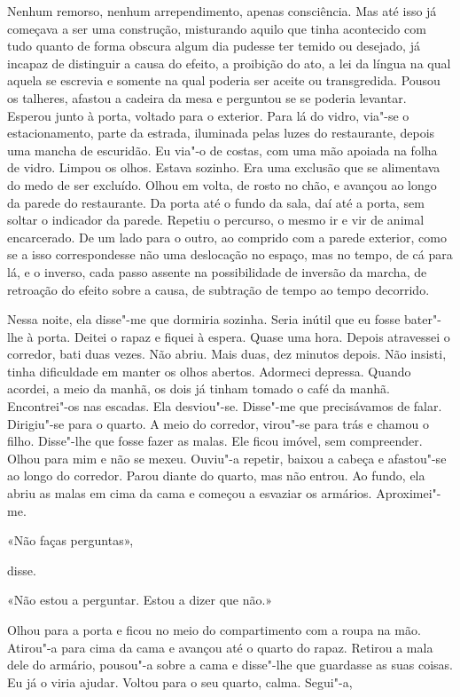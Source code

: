 Nenhum remorso, nenhum arrependimento, apenas consciência. Mas até isso
já começava a ser uma construção, misturando aquilo que tinha acontecido
com tudo quanto de forma obscura algum dia pudesse ter temido ou
desejado, já incapaz de distinguir a causa do efeito, a proibição do
ato, a lei da língua na qual aquela se escrevia e somente na qual
poderia ser aceite ou transgredida. Pousou os talheres, afastou a
cadeira da mesa e perguntou se se poderia levantar. Esperou junto à
porta, voltado para o exterior. Para lá do vidro, via"-se o
estacionamento, parte da estrada, iluminada pelas luzes do restaurante,
depois uma mancha de escuridão. Eu via"-o de costas, com uma mão apoiada
na folha de vidro. Limpou os olhos. Estava sozinho. Era uma exclusão que
se alimentava do medo de ser excluído. Olhou em volta, de rosto no chão,
e avançou ao longo da parede do restaurante. Da porta até o fundo da
sala, daí até a porta, sem soltar o indicador da parede. Repetiu o
percurso, o mesmo ir e vir de animal encarcerado. De um lado para o
outro, ao comprido com a parede exterior, como se a isso correspondesse
não uma deslocação no espaço, mas no tempo, de cá para lá, e o inverso,
cada passo assente na possibilidade de inversão da marcha, de retroação
do efeito sobre a causa, de subtração de tempo ao tempo decorrido.

Nessa noite, ela disse"-me que dormiria sozinha. Seria inútil que eu
fosse bater"-lhe à porta. Deitei o rapaz e fiquei à espera. Quase uma
hora. Depois atravessei o corredor, bati duas vezes. Não abriu. Mais
duas, dez minutos depois. Não insisti, tinha dificuldade em manter os
olhos abertos. Adormeci depressa. Quando acordei, a meio da manhã, os
dois já tinham tomado o café da manhã. Encontrei"-os nas escadas. Ela
desviou"-se. Disse"-me que precisávamos de falar. Dirigiu"-se para o
quarto. A meio do corredor, virou"-se para trás e chamou o filho.
Disse"-lhe que fosse fazer as malas. Ele ficou imóvel, sem compreender.
Olhou para mim e não se mexeu. Ouviu"-a repetir, baixou a cabeça e
afastou"-se ao longo do corredor. Parou diante do quarto, mas não
entrou. Ao fundo, ela abriu as malas em cima da cama e começou a
esvaziar os armários. Aproximei"-me.

«Não faças perguntas»,

disse.

«Não estou a perguntar. Estou a dizer que não.»

Olhou para a porta e ficou no meio do compartimento com a roupa na mão.
Atirou"-a para cima da cama e avançou até o quarto do rapaz. Retirou a
mala dele do armário, pousou"-a sobre a cama e disse"-lhe que guardasse
as suas coisas. Eu já o viria ajudar. Voltou para o seu quarto, calma.
Segui"-a,

